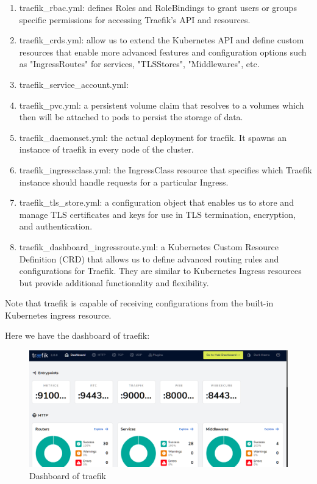\begin{enumerate}
\item traefik\_rbac.yml: defines Roles and RoleBindings to grant users or groups specific permissions for accessing Traefik's API and resources.
\item traefik\_crds.yml: allow us to extend the Kubernetes API and define custom resources that enable more advanced features and configuration options such as "IngressRoutes" for services, "TLSStores", "Middlewares", etc.
\item traefik\_service\_account.yml:  
\item traefik\_pvc.yml:  a persistent volume claim that resolves to a volumes which then will be attached to pods to persist the storage of data. 
\item traefik\_daemonset.yml: the actual deployment for traefik. It spawns an instance of traefik in every node of the cluster. 
\item traefik\_ingressclass.yml: the IngressClass resource that specifies which Traefik instance should handle requests for a particular Ingress. 
\item traefik\_tls\_store.yml: a configuration object that enables us to store and manage TLS certificates and keys for use in TLS termination, encryption, and authentication. 
\item traefik\_dashboard\_ingressroute.yml: a Kubernetes Custom Resource Definition (CRD) that allows us to define advanced routing rules and configurations for Traefik. They are similar to Kubernetes Ingress resources but provide additional functionality and flexibility. 
\end{enumerate}

Note that traefik is capable of receiving configurations from the built-in Kubernetes ingress resource. 

Here we have the dashboard of traefik: 

\begin{figure}[H]\centering
\includegraphics[width=1.0\textwidth,angle=00]{assets/f25.png}
\caption{ Dashboard of traefik }
\label{fig:dashboard of traefik}
\end{figure}

